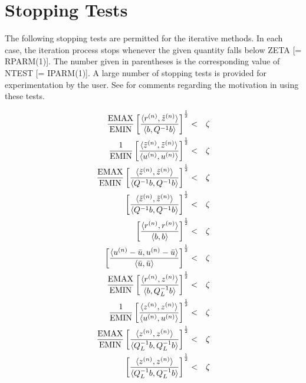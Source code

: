 \newpage
\section{Stopping Tests}
\label{stop}
\indent

    The following stopping tests are permitted for the iterative
methods.  In each case, the iteration process stops whenever the
given quantity falls below ZETA [= RPARM(1)].  The number given in
parentheses is the corresponding value of NTEST [= IPARM(1)].
A large number of stopping tests is provided for experimentation
by the user.  See \cite{NSPCG} for comments regarding the motivation 
in using these tests.
 
\begin{eqnarray}
   \frac{\mbox{EMAX}}{\mbox{EMIN}} \left[ \frac
       {\langle r^{(n)},\tilde z^{(n)}\rangle }
       {\langle b,Q^{-1}b \rangle} \right] ^{\frac{1}{2}}
    & < & \zeta                      \\
   \frac{1}{\mbox{EMIN}} \left[ \frac
       {\langle \tilde z^{(n)},\tilde z^{(n)}\rangle }
       {\langle u^{(n)},u^{(n)}\rangle } \right] ^{\frac{1}{2}}
    & < & \zeta                      \\
   \frac{\mbox{EMAX}}{\mbox{EMIN}} \left[ \frac
       {\langle \tilde z^{(n)},\tilde z^{(n)}\rangle}
       {\langle Q^{-1}b,Q^{-1}b\rangle } \right] ^{\frac{1}{2}}
    & < & \zeta                      \\
   \left[ \frac{\langle \tilde z^{(n)},\tilde z^{(n)}\rangle }
        {\langle Q^{-1}b,Q^{-1}b\rangle } \right] ^{\frac{1}{2}}
    & < & \zeta                      \\
   \left[ \frac{\langle r^{(n)},r^{(n)}\rangle}
     {\langle b,b \rangle } \right] ^{\frac{1}{2}}
    & < & \zeta                      \\
   \left[ \frac{\langle u^{(n)}-\bar{u},u^{(n)}-\bar{u} \rangle }
     {\langle \bar{u},\bar{u} \rangle } \right]^{\frac{1}{2}}
    & < & \zeta                      \\
   \frac{\mbox{EMAX}}{\mbox{EMIN}} \left[ \frac
       {\langle r^{(n)},z^{(n)}\rangle }
       {\langle b,Q_L^{-1}b \rangle} \right] ^{\frac{1}{2}}
    & < & \zeta                      \\
   \frac{1}{\mbox{EMIN}} \left[ \frac
       {\langle z^{(n)},z^{(n)}\rangle }
       {\langle u^{(n)},u^{(n)}\rangle } \right] ^{\frac{1}{2}}
    & < & \zeta                      \\
   \frac{\mbox{EMAX}}{\mbox{EMIN}} \left[ \frac
       {\langle z^{(n)},z^{(n)}\rangle}
       {\langle Q_L^{-1}b,Q_L^{-1}b\rangle } \right] ^{\frac{1}{2}}
    & < & \zeta                      \\
   \left[ \frac{\langle z^{(n)},z^{(n)}\rangle }
        {\langle Q_L^{-1}b,Q_L^{-1}b\rangle } \right] ^{\frac{1}{2}}
    & < & \zeta
\end{eqnarray}
 
